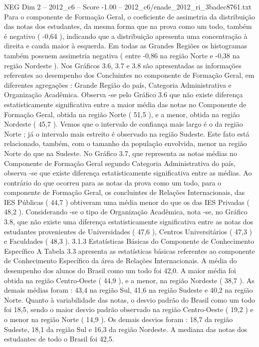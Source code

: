 \begin{textsample}{NEG Dim 2 – 2012\_c6 – Score -1.00 – 2012\_c6/enade\_2012\_ri\_3badec8761.txt}
Para o componente de Formação Geral, o coeficiente de assimetria da distribuição das notas dos estudantes, da mesma forma que na prova como um todo, também é negativo ( -0,64 ), indicando que a distribuição apresenta uma concentração à direita e cauda maior à esquerda.
Em todas as Grandes Regiões os histogramas também possuem assimetria negativa ( entre -0,86 na região Norte e -0,38 na região Nordeste ).
Nos Gráficos 3.6, 3.7 e 3.8 são apresentadas as informações referentes ao desempenho dos Concluintes no componente de Formação Geral, em diferentes agregações : Grande Região do país, Categoria Administrativa e Organização Acadêmica.
Observa -se pelo Gráfico 3.6 que não existe diferença estatisticamente significativa entre a maior média das notas no Componente de Formação Geral, obtida na região Norte ( 51,5 ), e a menor, obtida na região Nordeste ( 45,7 ).
Vemos que o intervalo de confiança mais largo é o da região Norte ; já o intervalo mais estreito é observado na região Sudeste.
Este fato está relacionado, também, com o tamanho da população envolvida, menor na região Norte do que na Sudeste.
No Gráfico 3.7, que representa as notas médias no Componente de Formação Geral segundo Categoria Administrativa do país, observa -se que existe diferença estatisticamente significativa entre as médias.
Ao contrário do que ocorreu para as notas da prova como um todo, para o componente de Formação Geral, os concluintes de Relações Internacionais, das IES Públicas ( 44,7 ) obtiveram uma média menor do que os das IES Privadas ( 48,2 ).
Considerando -se o tipo de Organização Acadêmica, nota -se, no Gráfico 3.8, que não existe uma diferença estatisticamente significativa entre as notas dos estudantes provenientes de Universidades ( 47,6 ), Centros Universitários ( 47,3 ) e Faculdades ( 48,3 ). 3.1.3 Estatísticas Básicas do Componente de Conhecimento Específico A Tabela 3.3 apresenta as estatísticas básicas referentes ao componente de Conhecimento Específico da área de Relações Internacionais.
A média do desempenho dos alunos do Brasil como um todo foi 42,0.
A maior média foi obtida na região Centro-Oeste ( 44,9 ), e a menor, na região Nordeste ( 38,7 ).
As demais médias foram : 43,4 na região Sul, 41,6 na região Sudeste e 40,2 na região Norte.
Quanto à variabilidade das notas, o desvio padrão do Brasil como um todo foi 18,5, sendo o maior desvio padrão observado na região Centro-Oeste ( 19,2 ) e o menor na região Norte ( 14,9 ).
Os demais desvios foram : 18,7 da região Sudeste, 18,1 da região Sul e 16,3 da região Nordeste.
A mediana das notas dos estudantes de todo o Brasil foi 42,5.

\end{textsample}

